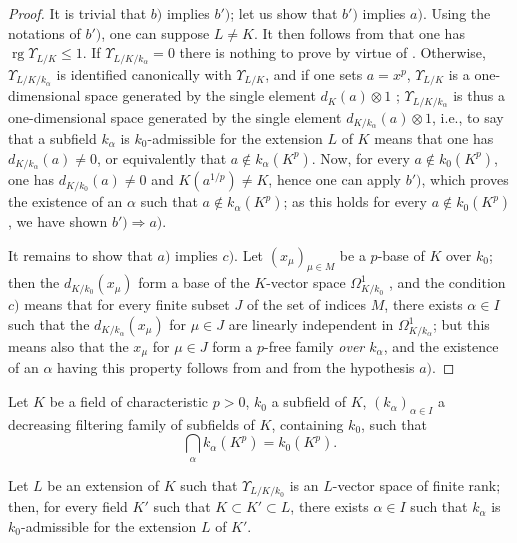 \begin{proof}
It is trivial that $b)$ implies $b')$; let us show that $b')$ implies $a)$.
Using the notations of $b')$, one can suppose $L\neq K$.
It then follows from  that one has $\operatorname{rg}\Upsilon_{L/K}\leqslant 1$.
If $\Upsilon_{L/K/k_\alpha}=0$ there is nothing to prove by virtue of .
Otherwise, $\Upsilon_{L/K/k_\alpha}$ is identified canonically with $\Upsilon_{L/K}$, and if one sets $a=x^p$, $\Upsilon_{L/K}$ is a one-dimensional space generated by the single element $d_K(a)\otimes 1$ ; $\Upsilon_{L/K/k_\alpha}$ is thus a one-dimensional space generated by the single element $d_{K/k_\alpha}(a)\otimes 1$, i.e., to say that a subfield $k_\alpha$ is $k_0$-admissible for the extension $L$ of $K$ means that one has $d_{K/k_\alpha}(a)\neq 0$, or equivalently  that $a\notin k_\alpha(K^p)$.
Now, for every $a\notin k_0(K^p)$, one has $d_{K/k_0}(a)\neq 0$ and $K(a^{1/p})\neq K$, hence one can apply $b')$, which proves the existence of an $\alpha$ such that $a\notin k_\alpha(K^p)$; as this holds for every $a\notin k_0(K^p)$, we have shown $b')\Rightarrow a)$.

It remains to show that $a)$ implies $c)$.
Let $(x_\mu)_{\mu\in M}$ be a $p$-base of $K$ over $k_0$; then the $d_{K/k_0}(x_\mu)$ form a base of the $K$-vector space $\Omega^1_{K/k_0}$ , and the condition $c)$ means that for every finite subset $J$ of the set of indices $M$, there exists $\alpha\in I$ such that the $d_{K/k_\alpha}(x_\mu)$ for $\mu\in J$ are linearly independent in $\Omega^1_{K/k_\alpha}$; but this means also  that the $x_\mu$ for $\mu\in J$ form a $p$-free family \emph{over $k_\alpha$}, and the existence of an $\alpha$ having this property follows from  and from the hypothesis $a)$.
\end{proof}

\begin{corollary}[21.8.4]
\label{0.21.8.4}
Let $K$ be a field of characteristic $p>0$, $k_0$ a subfield of $K$, $(k_\alpha)_{\alpha\in I}$ a decreasing filtering family of subfields of $K$, containing $k_0$, such that
\[
  \bigcap_\alpha k_\alpha(K^p)=k_0(K^p).
\]

Let $L$ be an extension of $K$ such that $\Upsilon_{L/K/k_0}$ is an $L$-vector space of finite rank; then, for every field $K'$ such that $K\subset K'\subset L$, there exists $\alpha\in I$ such that $k_\alpha$ is $k_0$-admissible for the extension $L$ of $K'$.
\end{corollary}

